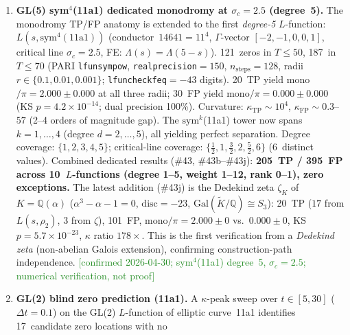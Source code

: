 \documentclass[11pt, a4paper]{article}
\theoremstyle{definition}
\theoremstyle{plain}
\begin{document}
\begin{enumerate}
        \textbf{165~TP / 264~FP across 8~$L$-functions
        (degree 1--4, weight 1--12, rank 0--1), zero exceptions.}
        \textcolor{ForestGreen}{[confirmed 2026-04-30; sym$^3$(11a1) degree~4, $\sigma_c{=}2$; numerical verification, not proof]}
  \item \textbf{GL(5) sym$^4$(11a1) dedicated monodromy at $\sigma_c = 2.5$ (degree~5).}
        The monodromy TP/FP anatomy is extended to the first
        \emph{degree-5} $L$-function: $L(s, \mathrm{sym}^4(11\mathrm{a}1))$
        (conductor~$14641 = 11^4$, $\Gamma$-vector $[-2,-1,0,0,1]$,
        critical line $\sigma_c = 2.5$, FE: $\Lambda(s) = \Lambda(5-s)$).
        121~zeros in $T \leq 50$, 187~in $T \leq 70$
        (PARI \texttt{lfunsympow}, \texttt{realprecision}$=150$,
        $n_{\mathrm{steps}} = 128$, radii $r \in \{0.1, 0.01, 0.001\}$;
        \texttt{lfuncheckfeq}$=-43$ digits).
        20~TP yield mono$/\pi = 2.000 \pm 0.000$ at all three radii;
        30~FP yield mono$/\pi = 0.000 \pm 0.000$
        (KS $p = 4.2 \times 10^{-14}$; dual precision 100\%).
        Curvature: $\kappa_{\mathrm{TP}} \sim 10^{4}$,
        $\kappa_{\mathrm{FP}} \sim 0.3$--$57$ (2--4 orders of magnitude gap).
        The $\mathrm{sym}^k$(11a1) tower now spans $k=1,\ldots,4$
        (degree $d=2,\ldots,5$), all yielding perfect separation.
        Degree coverage: $\{1, 2, 3, 4, 5\}$; critical-line coverage:
        $\{\tfrac{1}{2}, 1, \tfrac{3}{2}, 2, \tfrac{5}{2}, 6\}$ (6~distinct values).
        Combined dedicated results (\#43, \#43b--\#43j):
        \textbf{205~TP / 395~FP across 10~$L$-functions
        (degree 1--5, weight 1--12, rank 0--1), zero exceptions.}
        The latest addition (\#43j) is the Dedekind zeta $\zeta_K$ of
        $K = \mathbb{Q}(\alpha)$ ($\alpha^3 - \alpha - 1 = 0$,
        $\mathrm{disc} = -23$, $\mathrm{Gal}(\widetilde{K}/\mathbb{Q}) \cong S_3$):
        20~TP ($17$ from $L(s,\rho_2)$, $3$ from $\zeta$),
        101~FP, mono$/\pi = 2.000 \pm 0$ vs.\ $0.000 \pm 0$,
        KS $p = 5.7 \times 10^{-23}$, $\kappa$ ratio $178\times$.
        This is the first verification from a \emph{Dedekind zeta}
        (non-abelian Galois extension), confirming construction-path independence.
        \textcolor{ForestGreen}{[confirmed 2026-04-30; sym$^4$(11a1) degree~5, $\sigma_c{=}2.5$; numerical verification, not proof]}
  \item \textbf{GL(2) blind zero prediction (11a1).}
        A $\kappa$-peak sweep over $t\in[5,30]$ ($\Delta t=0.1$)
        on the GL(2) $L$-function of elliptic curve~11a1
        identifies 17~candidate zero locations with no

\end{enumerate}
\end{document}
